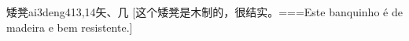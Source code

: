 \begin{EntryWithPhonetic}{矮凳}{ai3deng4}{13,14}{⽮、⼏}
  [这个矮凳是木制的，很结实。===Este banquinho é de madeira e bem resistente.]
\end{EntryWithPhonetic}

